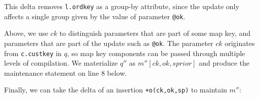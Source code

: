 {

\noindent This delta removes {\tt l.ordkey} as a group-by attribute,
since the update only affects a single group given by the value of parameter
{\tt @ok}.


\noindent Above, we use $ck$ to distinguish parameters that are part of some map
key, and parameters that are part of the update such as {\tt @ok}. The parameter
$ck$ originates from {\tt c.custkey} in $q$, so map key components can be
passed through multiple levels of compilation. We materialize $q''$ as
$m''[ck,ok,sprior]$ and produce the maintenance statement on line 8 below.


\noindent Finally, we can take the delta of an insertion {\tt +o(ck,ok,sp)} to
maintain $m''$:


}
